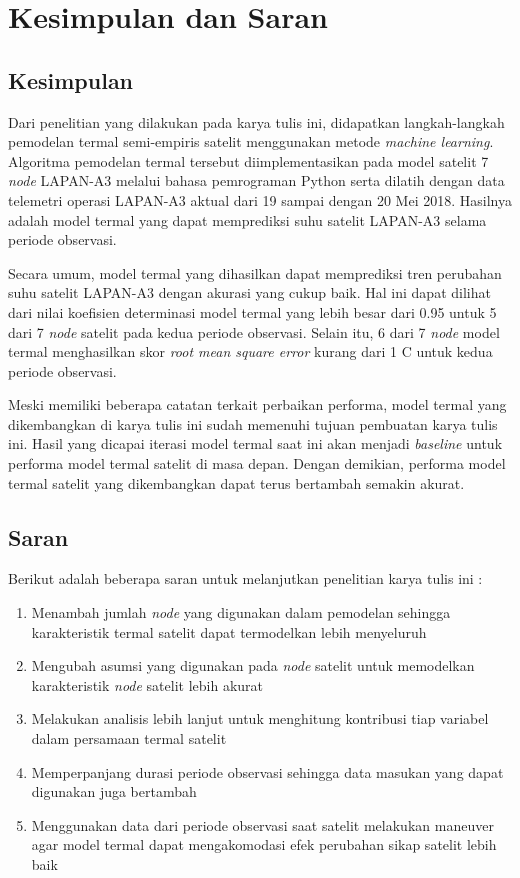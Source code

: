 \chapter{Kesimpulan dan Saran}

\section{Kesimpulan}

Dari penelitian yang dilakukan pada karya tulis ini, didapatkan langkah-langkah
pemodelan termal semi-empiris satelit menggunakan metode \textit{machine
learning}. Algoritma pemodelan termal tersebut diimplementasikan pada model
satelit 7 \textit{node} LAPAN-A3 melalui bahasa pemrograman Python serta
dilatih dengan data telemetri operasi LAPAN-A3 aktual dari 19 sampai dengan 20
Mei 2018. Hasilnya adalah model termal yang dapat memprediksi suhu satelit
LAPAN-A3 selama periode observasi.

Secara umum, model termal yang dihasilkan dapat memprediksi tren perubahan suhu
satelit LAPAN-A3 dengan akurasi yang cukup baik. Hal ini dapat dilihat dari
nilai koefisien determinasi model termal yang lebih besar dari 0.95 untuk 5
dari 7 \textit{node} satelit pada kedua periode observasi. Selain itu, 6 dari 7
\textit{node} model termal menghasilkan skor \textit{root mean square error}
kurang dari 1 \degree C untuk kedua periode observasi.

Meski memiliki beberapa catatan terkait perbaikan performa, model termal yang
dikembangkan di karya tulis ini sudah memenuhi tujuan pembuatan karya tulis
ini. Hasil yang dicapai iterasi model termal saat ini akan menjadi
\textit{baseline} untuk performa model termal satelit di masa depan. Dengan
demikian, performa model termal satelit yang dikembangkan dapat terus bertambah
semakin akurat.

\section{Saran}

Berikut adalah beberapa saran untuk melanjutkan penelitian karya tulis ini :

\begin{enumerate}
\item Menambah jumlah \textit{node} yang digunakan dalam pemodelan sehingga karakteristik termal satelit dapat termodelkan lebih menyeluruh
\item Mengubah asumsi yang digunakan pada \textit{node} satelit untuk memodelkan karakteristik \textit{node} satelit lebih akurat
\item Melakukan analisis lebih lanjut untuk menghitung kontribusi tiap variabel dalam persamaan termal satelit
\item Memperpanjang durasi periode observasi sehingga data masukan yang dapat digunakan juga bertambah
\item Menggunakan data dari periode observasi saat satelit melakukan maneuver agar model termal dapat mengakomodasi efek perubahan sikap satelit lebih baik
\end{enumerate}
